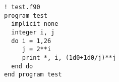\documentclass{jsarticle}
\begin{document}
\begin{lstlisting}[language={[90]Fortran}]
! test.f90
program test
  implicit none
  integer i, j
  do i = 1,26
     j = 2**i
     print *, i, (1d0+1d0/j)**j
  end do
end program test
\end{lstlisting}
\end{document}
